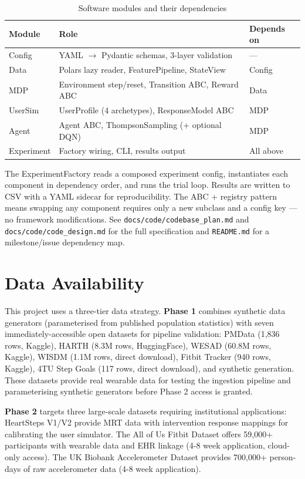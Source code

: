 \documentclass[11pt,a4paper]{article}
\begin{document}
\begin{table}[H]
\centering
\caption{Software modules and their dependencies}
\begin{tabular}{lll}
\toprule
Module & Role & Depends on \\
\midrule
Config & YAML $\rightarrow$ Pydantic schemas, 3-layer validation & --- \\
Data & Polars lazy reader, FeaturePipeline, StateView & Config \\
MDP & Environment step/reset, Transition ABC, Reward ABC & Data \\
UserSim & UserProfile (4 archetypes), ResponseModel ABC & MDP \\
Agent & Agent ABC, ThompsonSampling (+ optional DQN) & MDP \\
Experiment & Factory wiring, CLI, results output & All above \\
\bottomrule
\end{tabular}
\end{table}

The ExperimentFactory reads a composed experiment config, instantiates
each component in dependency order, and runs the trial loop. Results are
written to CSV with a YAML sidecar for reproducibility. The ABC + registry
pattern means swapping any component requires only a new subclass and a
config key --- no framework modifications. See
\texttt{docs/code/codebase\_plan.md} and \texttt{docs/code/code\_design.md}
for the full specification and \texttt{README.md} for a milestone/issue
dependency map.

\section{Data Availability}
\label{sec:data}

This project uses a three-tier data strategy. \textbf{Phase 1} combines synthetic data generators (parameterised from published population statistics) with seven immediately-accessible open datasets for pipeline validation: PMData (1,836 rows, Kaggle), HARTH (8.3M rows, HuggingFace), WESAD (60.8M rows, Kaggle), WISDM (1.1M rows, direct download), Fitbit Tracker (940 rows, Kaggle), 4TU Step Goals (117 rows, direct download), and synthetic generation. These datasets provide real wearable data for testing the ingestion pipeline and parameterising synthetic generators before Phase 2 access is granted.

\textbf{Phase 2} targets three large-scale datasets requiring institutional applications: HeartSteps V1/V2 \cite{klasnja2019heartsteps,klasnja2022heartsteps} provide MRT data with intervention response mappings for calibrating the user simulator. The All of Us Fitbit Dataset \cite{patten2026allofus} offers 59,000+ participants with wearable data and EHR linkage (4-8 week application, cloud-only access). The UK Biobank Accelerometer Dataset \cite{williamson2024ukbiobank} provides 700,000+ person-days of raw accelerometer data (4-8 week application).
\end{document}
